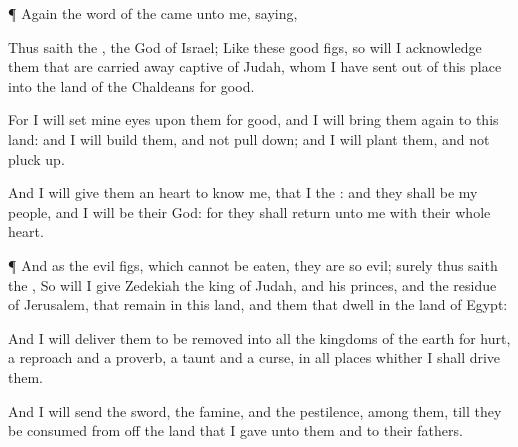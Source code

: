{\par }{\PP {}¶ Again the
word of the
{} came unto me,
saying,

Thus
saith the
{}, the
God of
Israel; Like these
good
figs, so will I
acknowledge them that are carried away
captive of
Judah, whom I have
sent out of this
place into the
land of the
Chaldeans for
{}
good.

For I will
set mine
eyes upon them for
good, and I will bring them
again to this
land: and I will
build them, and not pull
{}
down; and I will
plant them, and not pluck
{}
up.

And I will
give them an
heart to
know me, that I
{} the
{}: and they shall be my
people, and I will be their
God: for they shall
return unto me with their whole
heart.


\par }{\PP {}¶ And as the
evil
figs, which cannot be
eaten, they are so
evil; surely thus
saith the
{}, So will I
give
Zedekiah the
king of
Judah, and his
princes, and the
residue of
Jerusalem, that
remain in this
land, and them that
dwell in the
land of
Egypt:

And I will
deliver them to be
removed into all the
kingdoms of the
earth for
{}
hurt,
{} a
reproach and a
proverb, a
taunt and a
curse, in all
places whither I shall
drive them.

And I will
send the
sword, the
famine, and the
pestilence, among them, till they be
consumed from off the
land that I
gave unto them and to their
fathers.




\par }
